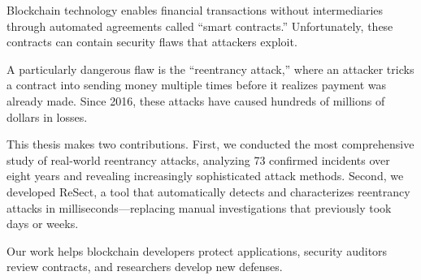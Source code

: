 Blockchain technology enables financial transactions without intermediaries through automated agreements called ``smart contracts.'' Unfortunately, these contracts can contain security flaws that attackers exploit.

A particularly dangerous flaw is the ``reentrancy attack,'' where an attacker tricks a contract into sending money multiple times before it realizes payment was already made. Since 2016, these attacks have caused hundreds of millions of dollars in losses.

This thesis makes two contributions. First, we conducted the most comprehensive study of real-world reentrancy attacks, analyzing 73 confirmed incidents over eight years and revealing increasingly sophisticated attack methods. Second, we developed ReSect, a tool that automatically detects and characterizes reentrancy attacks in milliseconds---replacing manual investigations that previously took days or weeks.

Our work helps blockchain developers protect applications, security auditors review contracts, and researchers develop new defenses.
